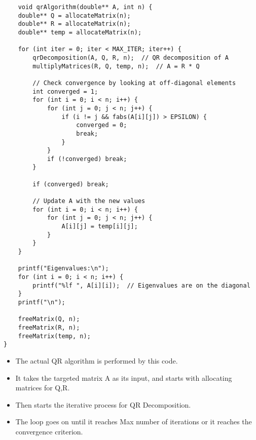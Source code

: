 \documentclass{article}
\begin{document}
\begin{lstlisting}
    void qrAlgorithm(double** A, int n) {
    double** Q = allocateMatrix(n);
    double** R = allocateMatrix(n);
    double** temp = allocateMatrix(n);

    for (int iter = 0; iter < MAX_ITER; iter++) {
        qrDecomposition(A, Q, R, n);  // QR decomposition of A
        multiplyMatrices(R, Q, temp, n);  // A = R * Q
        
        // Check convergence by looking at off-diagonal elements
        int converged = 1;
        for (int i = 0; i < n; i++) {
            for (int j = 0; j < n; j++) {
                if (i != j && fabs(A[i][j]) > EPSILON) {
                    converged = 0;
                    break;
                }
            }
            if (!converged) break;
        }

        if (converged) break;

        // Update A with the new values
        for (int i = 0; i < n; i++) {
            for (int j = 0; j < n; j++) {
                A[i][j] = temp[i][j];
            }
        }
    }

    printf("Eigenvalues:\n");
    for (int i = 0; i < n; i++) {
        printf("%lf ", A[i][i]);  // Eigenvalues are on the diagonal
    }
    printf("\n");

    freeMatrix(Q, n);
    freeMatrix(R, n);
    freeMatrix(temp, n);
}
\end{lstlisting}
\begin{itemize}
\item The actual QR algorithm is performed by this code. 
\item It takes the targeted matrix A as its input, and starts with allocating matrices for Q,R.
\item Then starts the iterative process for QR Decomposition.
\item The loop goes on until it reaches Max number of iterations or it reaches the convergence criterion. 
\end{itemize}
\end{document}
